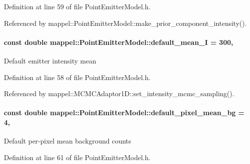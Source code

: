 Definition at line 59 of file Point\+Emitter\+Model.\+h.



Referenced by mappel\+::\+Point\+Emitter\+Model\+::make\+\_\+prior\+\_\+component\+\_\+intensity().

\paragraph[{\texorpdfstring{default\+\_\+mean\+\_\+I}{default_mean_I}}]{\setlength{\rightskip}{0pt plus 5cm}const double mappel\+::\+Point\+Emitter\+Model\+::default\+\_\+mean\+\_\+I = 300\hspace{0.3cm}{\ttfamily [static]}, {\ttfamily [inherited]}}\hypertarget{classmappel_1_1PointEmitterModel_a575dd30a0afb886db82ac725c8cc8df3}{}\label{classmappel_1_1PointEmitterModel_a575dd30a0afb886db82ac725c8cc8df3}
Default emitter intensity mean 

Definition at line 58 of file Point\+Emitter\+Model.\+h.



Referenced by mappel\+::\+M\+C\+M\+C\+Adaptor1\+D\+::set\+\_\+intensity\+\_\+mcmc\+\_\+sampling().

\paragraph[{\texorpdfstring{default\+\_\+pixel\+\_\+mean\+\_\+bg}{default_pixel_mean_bg}}]{\setlength{\rightskip}{0pt plus 5cm}const double mappel\+::\+Point\+Emitter\+Model\+::default\+\_\+pixel\+\_\+mean\+\_\+bg = 4\hspace{0.3cm}{\ttfamily [static]}, {\ttfamily [inherited]}}\hypertarget{classmappel_1_1PointEmitterModel_abe82d75be8586234657a61e2f137a6c8}{}\label{classmappel_1_1PointEmitterModel_abe82d75be8586234657a61e2f137a6c8}
Default per-\/pixel mean background counts 

Definition at line 61 of file Point\+Emitter\+Model.\+h.



